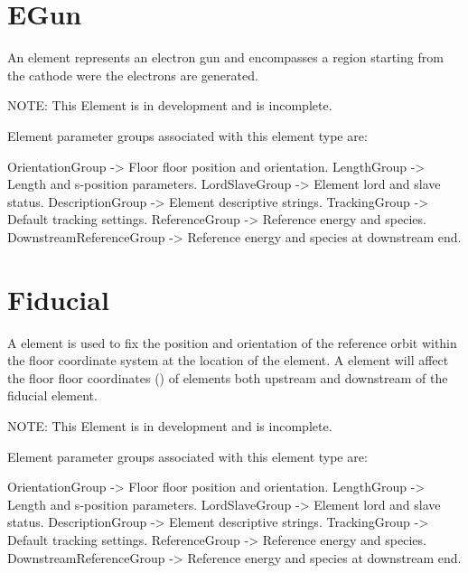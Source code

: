 \section{EGun}
\label{s:egun}

An  element represents an electron gun and encompasses a region starting from the cathode
were the electrons are generated.  

NOTE: This Element is in development and is incomplete.

Element parameter groups associated with this element type are:
\TOPrule
\begin{example}
  OrientationGroup -> Floor floor position and orientation.  
  LengthGroup        -> Length and s-position parameters.  
  LordSlaveGroup     -> Element lord and slave status.  
  DescriptionGroup   -> Element descriptive strings.  
  TrackingGroup      -> Default tracking settings.  
  ReferenceGroup     -> Reference energy and species. 
  DownstreamReferenceGroup -> Reference energy and species at downstream end. 
\end{example}
\BOTTOMrule

\section{Fiducial}
\label{s:fiducial}

A  element is used to fix the position and orientation of the reference orbit within
the floor coordinate system at the location of the  element. A  element
will affect the floor floor coordinates () of elements both upstream and downstream
of the fiducial element.

NOTE: This Element is in development and is incomplete.

Element parameter groups associated with this element type are:
\TOPrule
\begin{example}
  OrientationGroup -> Floor floor position and orientation.  
  LengthGroup        -> Length and s-position parameters.  
  LordSlaveGroup     -> Element lord and slave status.  
  DescriptionGroup   -> Element descriptive strings.  
  TrackingGroup      -> Default tracking settings.  
  ReferenceGroup     -> Reference energy and species. 
  DownstreamReferenceGroup -> Reference energy and species at downstream end. 
\end{example}
\BOTTOMrule


